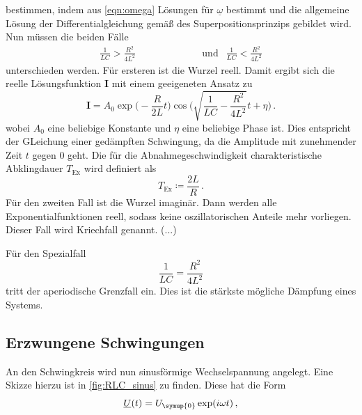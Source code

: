 bestimmen, indem aus \eqref{eqn:omega} Lösungen für $\underline{\omega}$ bestimmt
und die allgemeine Lösung der Differentialgleichung gemäß des Superpositionsprinzips
gebildet wird. Nun müssen die beiden Fälle
\begin{align}
  \frac{1}{LC}>\frac{R^2}{4L^2} & \qquad\qquad\qquad\text{und} & \frac{1}{LC}<\frac{R^2}{4L^2}
\end{align}
unterschieden werden. Für ersteren ist die Wurzel reell. Damit ergibt sich die
reelle Lösungsfunktion $\symbf{I}$ mit einem geeigeneten Ansatz zu
\begin{equation}
  \symbf{I}=A_{\text{0}}\exp\biggl(-\frac{R}{2L}t\biggr)\cos\Biggl(
  \sqrt{\frac{1}{LC}-\frac{R^2}{4L^2}}t+\eta\Biggr)\,.
\end{equation}
wobei $A_{\text{0}}$ eine beliebige Konstante und $\eta$ eine beliebige Phase ist.
Dies entspricht der GLeichung einer gedämpften Schwingung, da die Amplitude mit zunehmender
Zeit $t$ gegen $0$ geht.
Die für die Abnahmegeschwindigkeit charakteristische Abklingdauer $T_{\text{Ex}}$
wird definiert als
\begin{equation}
  T_{\text{Ex}}\coloneq\frac{2L}{R} \,.
  \label{eqn:abklingdauer}
\end{equation}
Für den zweiten Fall ist die Wurzel imaginär. Dann werden alle Exponentialfunktionen
reell, sodass keine oszillatorischen Anteile mehr vorliegen. Dieser Fall wird
Kriechfall genannt. (...)


Für den Spezialfall
\begin{equation}
  \frac{1}{LC}=\frac{R^2}{4L^2}
\end{equation}
tritt der aperiodische Grenzfall ein. Dies ist die stärkste mögliche Dämpfung eines
Systems.

\subsection{Erzwungene Schwingungen}
\label{Erzwungene_Schwingungen}

An den Schwingkreis wird nun sinusförmige Wechselspannung angelegt. Eine Skizze
hierzu ist in \ref{fig:RLC_sinus} zu finden. Diese hat die Form
\begin{equation}
  \underline{U}(t)=U_{\symup{0}}\exp(i\omega t) \,,
\end{equation}

